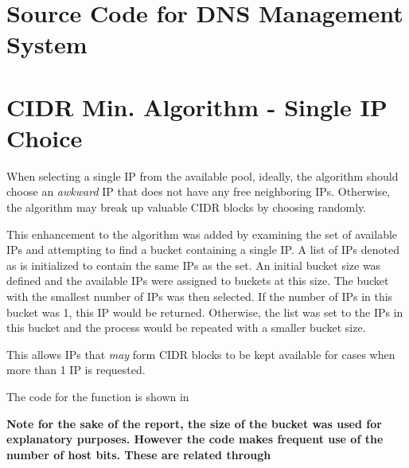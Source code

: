 \begin{appendices}

\chapter{Source Code for DNS Management System}
\label{appendix:dnsManagement}






\chapter{CIDR Min. Algorithm - Single IP Choice}
\label{appendix:smartSingleIP}
When selecting a single IP from the available pool, ideally, the algorithm should choose an \textit{awkward} IP that does not have any free neighboring IPs. Otherwise, the algorithm may break up valuable CIDR blocks by choosing randomly. 

This enhancement to the algorithm was added by examining the set of available IPs and attempting to find a bucket containing a single IP. A list of IPs denoted as  is initialized to contain the same IPs as the  set. An initial bucket size was defined and the available IPs were assigned to buckets at this size. The bucket with the smallest number of IPs was then selected. If the number of IPs in this bucket was 1, this IP would be returned. Otherwise, the  list was set to the IPs in this bucket and the process would be repeated with a smaller bucket size. 

This allows IPs that \textit{may} form CIDR blocks to be kept available for cases when more than 1 IP is requested. 

The code for the function is shown in 

\textbf{Note for the sake of the report, the size of the bucket was used for explanatory purposes. However the code makes frequent use of the number of host bits. These are related through }


\end{appendices}
